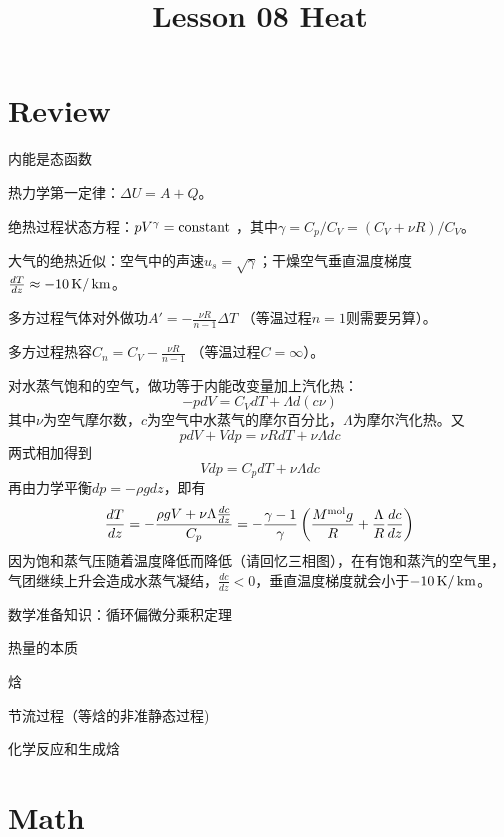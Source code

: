 \documentclass[CJK]{beamer}
\title{Lesson 08 Heat}
\author{}
\date{}
\begin{document}

\section{Review}

\begin{frame}
\bch
\bitem
\item{内能是态函数}
\item{热力学第一定律：$\Delta U = A + Q$。}
\item{绝热过程状态方程：$pV^\gamma = \mathrm{constant}$ ，其中$\gamma = C_p/C_V = (C_V + \nu R)/C_V$。}
\item{大气的绝热近似：空气中的声速$u_s =\sqrt{\gamma}$；干燥空气垂直温度梯度$\frac{dT}{dz} \approx -10 \,\mathrm{K}/\,\mathrm{km}$。}
\item{多方过程气体对外做功$A' = -\frac{\nu R}{n-1}\Delta T$ （等温过程$n=1$则需要另算）。}
\item{多方过程热容$C_n =C_V -\frac{\nu R}{n-1}$ （等温过程$C = \infty$）。}
\eitem
\ech
\end{frame}

\begin{frame}
\bch
{\small
对水蒸气饱和的空气，做功等于内能改变量加上汽化热：
$$ -pdV = C_V dT + \Lambda d(c\nu) $$
其中$\nu$为空气摩尔数，$c$为空气中水蒸气的摩尔百分比，$\Lambda$为摩尔汽化热。又
$$pdV + Vdp = \nu R dT + \nu \Lambda dc$$
两式相加得到
$$ Vdp = C_p  dT + \nu \Lambda dc $$
再由力学平衡$ dp = -\rho g dz$，即有
$$ \frac{dT}{dz} =-\frac{\rho g V + \nu\Lambda\frac{dc}{dz}}{C_p} = -\frac{\gamma-1}{\gamma}\left(\frac{M^{\rm mol}g}{R}+\frac{\Lambda}{R}\frac{dc}{dz}\right)$$
因为饱和蒸气压随着温度降低而降低（请回忆三相图），在有饱和蒸汽的空气里，气团继续上升会造成水蒸气凝结，$ \frac{dc}{dz} < 0 $，垂直温度梯度就会小于$-10\,\mathrm{K}/\,\mathrm{km}$。
}
\ech
\end{frame}


\begin{frame}
\bch
\bitem
\item{数学准备知识：循环偏微分乘积定理}
\item{热量的本质}
\item{焓}
\item{节流过程（等焓的非准静态过程)}
\item{化学反应和生成焓}
\eitem
\ech
\end{frame}

\section{Math}
\end{document}
